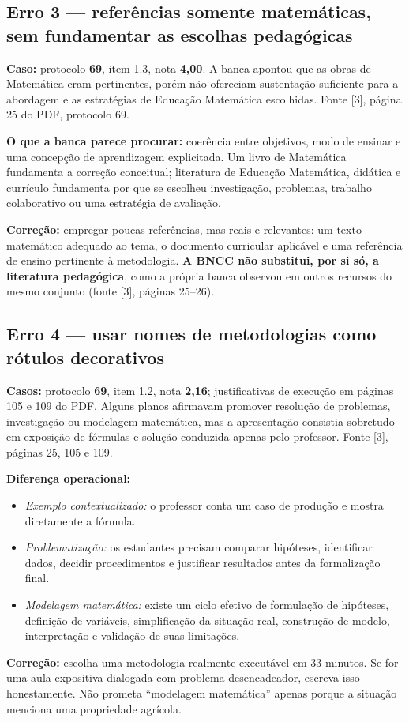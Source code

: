 \documentclass[11pt,a4paper]{article}
\begin{document}
\subsection{Erro 3 --- referências somente matemáticas, sem fundamentar as escolhas pedagógicas}
\textbf{Caso:} protocolo \textbf{69}, item 1.3, nota \textbf{4,00}. A banca apontou que as obras de Matemática eram pertinentes, porém não ofereciam sustentação suficiente para a abordagem e as estratégias de Educação Matemática escolhidas. Fonte [3], página 25 do PDF, protocolo 69.

\textbf{O que a banca parece procurar:} coerência entre objetivos, modo de ensinar e uma concepção de aprendizagem explicitada. Um livro de Matemática fundamenta a correção conceitual; literatura de Educação Matemática, didática e currículo fundamenta por que se escolheu investigação, problemas, trabalho colaborativo ou uma estratégia de avaliação.

\textbf{Correção:} empregar poucas referências, mas reais e relevantes: um texto matemático adequado ao tema, o documento curricular aplicável e uma referência de ensino pertinente à metodologia. \textbf{A BNCC não substitui, por si só, a literatura pedagógica}, como a própria banca observou em outros recursos do mesmo conjunto (fonte [3], páginas 25--26).

\subsection{Erro 4 --- usar nomes de metodologias como rótulos decorativos}
\textbf{Casos:} protocolo \textbf{69}, item 1.2, nota \textbf{2,16}; justificativas de execução em páginas 105 e 109 do PDF. Alguns planos afirmavam promover resolução de problemas, investigação ou modelagem matemática, mas a apresentação consistia sobretudo em exposição de fórmulas e solução conduzida apenas pelo professor. Fonte [3], páginas 25, 105 e 109.

\textbf{Diferença operacional:}
\begin{itemize}
\item \textit{Exemplo contextualizado:} o professor conta um caso de produção e mostra diretamente a fórmula.
\item \textit{Problematização:} os estudantes precisam comparar hipóteses, identificar dados, decidir procedimentos e justificar resultados antes da formalização final.
\item \textit{Modelagem matemática:} existe um ciclo efetivo de formulação de hipóteses, definição de variáveis, simplificação da situação real, construção de modelo, interpretação e validação de suas limitações.
\end{itemize}
\textbf{Correção:} escolha uma metodologia realmente executável em 33 minutos. Se for uma aula expositiva dialogada com problema desencadeador, escreva isso honestamente. Não prometa ``modelagem matemática'' apenas porque a situação menciona uma propriedade agrícola.
\end{document}

